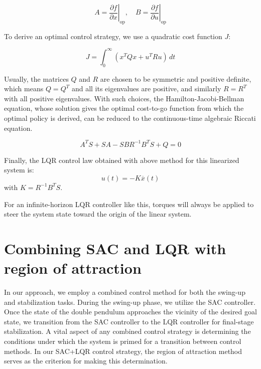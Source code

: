\begin{equation}
 A = \left.\frac{\partial f}{\partial x}\right|_{\text{op}}, \quad B = \left.\frac{\partial f}{\partial u}\right|_{\text{op}}
\end{equation}


To derive an optimal control strategy, we use a quadratic cost function \(J\):

\begin{equation}
  J = \int_0^{\infty} \left( x^T Q x + u^T R u \right) \, dt
\end{equation}

Usually, the matrices \(Q\) and \(R\) are chosen to be symmetric and positive definite, which means \(Q = Q^T\) and all its eigenvalues are positive, and similarly \(R = R^T\) with all positive eigenvalues. With such choices, the Hamilton-Jacobi-Bellman equation, whose solution gives the optimal cost-to-go function from which the optimal policy is derived, can be reduced to the continuous-time algebraic Riccati equation.

\begin{equation}
 A^T S + SA - SBR^{-1}B^T S + Q = 0
\end{equation}

Finally, the LQR control law obtained with above method for this linearized system is:
\begin{equation}
 u(t) = -K\overline{x}(t)
\end{equation}
with \(K = R^{-1}B^T S\).

For an infinite-horizon LQR controller like this, torques will always be applied to steer the system state toward the origin of the linear system.


\section{Combining SAC and LQR with region of attraction}
In our approach, we employ a combined control method for both the swing-up and stabilization tasks. During the swing-up phase, we utilize the SAC controller. Once the state of the double pendulum approaches the vicinity of the desired goal state, we transition from the SAC controller to the LQR controller for final-stage stabilization. A vital aspect of any combined control strategy is determining the conditions under which the system is primed for a transition between control methods. In our SAC+LQR control strategy, the region of attraction method\cite{maywald2022co} serves as the criterion for making this determination.

